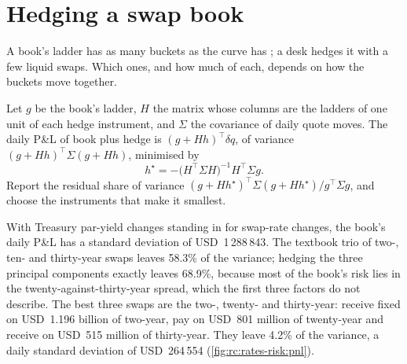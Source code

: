 \section{Hedging a swap book}

A book's ladder has as many buckets as the curve has ; a desk hedges it
with a few liquid swaps. Which ones, and how much of each, depends on how the
buckets move together.

\begin{method}\label{met:rc:rates-risk:mvhedge}
Let $g$ be the book's ladder, $H$ the matrix whose columns are the ladders of
one unit of each hedge instrument, and $\Sigma$ the covariance of daily quote
moves. The daily P\&L of book plus hedge is $(g+Hh)^\top\delta q$, of variance
$(g+Hh)^\top\Sigma(g+Hh)$, minimised by
\[
h^\star = -\bigl(H^\top\Sigma H\bigr)^{-1}H^\top\Sigma g .
\]
Report the residual share of variance $(g+Hh^\star)^\top\Sigma(g+Hh^\star) /
g^\top\Sigma g$, and choose the instruments that make it smallest.
\end{method}

\label{lst:rc:rates-risk:hedge}

\begin{example}\label{ex:rc:rates-risk:hedge}
With Treasury par-yield changes standing in for swap-rate changes, the book's
daily P\&L has a standard deviation of USD~1\,288\,843. The textbook trio of two-,
ten- and thirty-year swaps leaves 58.3\% of the variance; hedging the three
principal components exactly leaves 68.9\%, because most of the book's risk
lies in the twenty-against-thirty-year spread, which the first three factors do
not describe. The best three swaps are the two-, twenty- and thirty-year:
receive fixed on USD~1.196 billion of two-year, pay on USD~801 million of
twenty-year and receive on USD~515 million of thirty-year. They leave 4.2\%
of the variance, a daily standard deviation of USD~264\,554
(\cref{fig:rc:rates-risk:pnl}).
\end{example}

